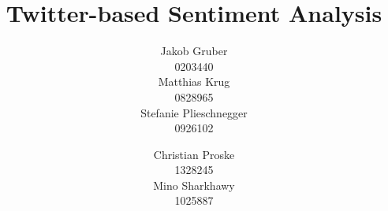\documentclass{acm_proc_article-sp}
\begin{document}
\title{Twitter-based Sentiment Analysis}

%
%
%
%
%

%
\author{
%
%
\alignauthor Jakob Gruber\\
      0203440\\
       \email{}
\alignauthor Matthias Krug\\
      0828965\\
       \email{}
\alignauthor Stefanie Plieschnegger\\
      0926102\\
\and %
\alignauthor Christian Proske\\
         1328245 \\
       \email{}
\alignauthor Mino Sharkhawy \\
      1025887 \\
       \email{}
}
\end{document}
